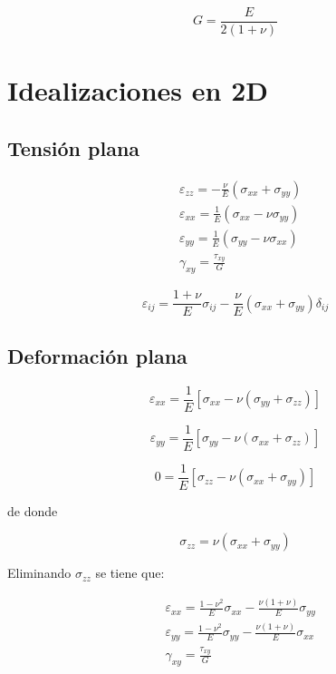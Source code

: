 \documentclass[../notas medios.tex]{subfiles}
\begin{document}
\[G = \dfrac{E}{2(1 + \nu)}\]


\section{Idealizaciones en 2D}
\subsection{Tensión plana}

\begin{equation} \label{platension}
\begin{split}
& {\varepsilon _{zz}} =  - \frac{\nu }{E}({\sigma _{xx}} + {\sigma _{yy}}) \\
& {\varepsilon _{xx}} =    \frac{1}{E}({\sigma _{xx}} - \nu {\sigma _{yy}})\\ 
& {\varepsilon _{yy}} = \frac{1}{E}({\sigma _{yy}} - \nu {\sigma _{xx}})   \\
& {\gamma _{xy}} = \frac{{{\tau _{xy}}}}{G}
\end{split}
\end{equation}

\[{\varepsilon _{ij}} = \frac{{1 + \nu }}{E}{\sigma _{ij}} - \frac{\nu }{E}({\sigma _{xx}} + {\sigma _{yy}}){\delta _{ij}}\]


\subsection{Deformación plana}

\[{\varepsilon _{xx}} = \frac{1}{E}\left[ {{\sigma _{xx}} - \nu ({\sigma _{yy}} + {\sigma _{zz}})} \right]\]

\[{\varepsilon _{yy}} = \frac{1}{E}\left[ {{\sigma _{yy}} - \nu ({\sigma _{xx}} + {\sigma _{zz}})} \right]\]

\[0 = \frac{1}{E}\left[ {{\sigma _{zz}} - \nu ({\sigma _{xx}} + {\sigma _{yy}})} \right]\]

de donde

\[{\sigma _{zz}} = \nu ({\sigma _{xx}} + {\sigma _{yy}})\]

Eliminando $\sigma _{zz}$ se tiene que:

\begin{equation} \label{plastrain}
\begin{split}
& {\varepsilon _{xx}} = \frac{{1 - {\nu ^2}}}{E}{\sigma _{xx}} - \frac{{\nu (1 + \nu )}}{E}{\sigma _{yy}} \\
& {\varepsilon _{yy}} = \frac{{1 - {\nu ^2}}}{E}{\sigma _{yy}} - \frac{{\nu (1 + \nu )}}{E}{\sigma _{xx}} \\ 
& {\gamma _{xy}} = \frac{{{\tau _{xy}}}}{G}
\end{split}
\end{equation}
\end{document}
